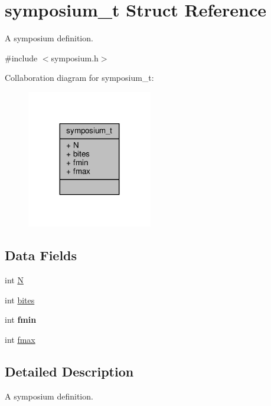 \hypertarget{structsymposium__t}{}\section{symposium\+\_\+t Struct Reference}
\label{structsymposium__t}


A symposium definition.  




{\ttfamily \#include $<$symposium.\+h$>$}



Collaboration diagram for symposium\+\_\+t\+:\nopagebreak
\begin{figure}[H]
\begin{center}
\leavevmode
\includegraphics[width=155pt]{structsymposium__t__coll__graph}
\end{center}
\end{figure}
\subsection*{Data Fields}
\begin{DoxyCompactItemize}
\item 
int \hyperlink{structsymposium__t_a4e366c10036b2d89ebc2dbcdefba8999}{N}
\item 
int \hyperlink{structsymposium__t_a9ee1b978200b8a4b7c30b170c1f20643}{bites}
\item 
\mbox{\label{structsymposium__t_ab7af5af3a92d6c03bf916571a09d6aed}} 
int {\bfseries fmin}
\item 
int \hyperlink{structsymposium__t_a038b49a350225fed31d5c148a9147ec6}{fmax}
\end{DoxyCompactItemize}


\subsection{Detailed Description}
A symposium definition. 

